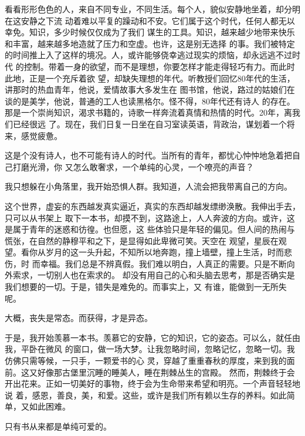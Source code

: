 		看看形形色色的人，来自不同专业，不同生活。每个人，貌似安静地坐着，却分明在这安静之下流
	动着难以平复的躁动和不安。它们属于这个时代，任何人都无以幸免。知识，多少时候仅仅成为了我们
	谋生的工具。知识，越来越少地带来快乐和丰富，越来越多地造就了压力和空虚。也许，这是别无选择
	的事。我们被特定的时间推上入了这样的境况。人，或许能够侥幸逃过现实的烦恼，却永远逃不过时代
	的控制。带着一身的欲望，而不是理想，你要怎样才能走得轻巧有力。而此时此地，正是一个充斥着欲
	望，却缺失理想的年代。听教授们回忆80年代的生活，讲那时的热血青年，他说，爱情故事大多发生在
	图书馆，他说，路过的姑娘们在谈的是美学，他说，普通的工人也读黑格尔。怪不得，80年代还有诗人
	的存在。那是一个崇尚知识，渴求书籍的，诗歌一样奔流着真情和热情的时代。20年，离我们已经很远
	了。现在，我们日复一日坐在自习室读英语，背政治，谋划着一个将来，感觉疲惫。

		这是个没有诗人，也不可能有诗人的时代。当所有的青年，都忧心忡忡地急着把自己打磨光滑，你
	又怎么敢奢求，一个单纯的心灵，一个嘹亮的声音？

		我只想躲在小角落里，我开始恐惧人群。我知道，人流会把我带离自己的方向。

		这个世界，虚妄的东西越发真实逼近，真实的东西却越发缥缈涣散。我伸出手去，只可以从书架上
	取下一本书，却摸不到，这路途上，人人奔波的方向。或许，这是属于青年的迷惑和彷徨。也但愿，这
	些体验只是年轻的偏见。但人间的热闹与慌张，在自然的静穆平和之下，是显得如此卑微可笑。天空在
	观望，星辰在观望。看你从岁月的这一头升起，不知所以地奔跑，撞上墙壁，撞上生活，时而悲伤，时
	而幸福。我们总是不辨真假。我们难以明白，人真正的需要。只是不断向外索求，一切别人也在索求的。
	却没有用自己的心和头脑去思考，那是否确实是我们想要的一切。于是，错失是难免的。而事实上，又
	有谁，能做到一无所失呢。

		大概，丧失是常态。而获得，才是异态。

		于是，我开始羡慕一本书。羡慕它的安静，它的知识，它的姿态。可以么，就任由我，平卧在微风
	的窗口，做一场大梦。让我忽略时间，忽略记忆，忽略一切。我仿佛只需等候，一只手，一颗爱书的心
	灵，穿越了重重春秋的厚度，来到我的面前。这又好像那古堡里沉睡的睡美人，睡在荆棘丛生的宫殿。
	然而，荆棘终于会开出花来。正如一切美好的事物，终于会为生命带来希望和明亮。一个声音轻轻地说
	着，感恩，善良，美，和爱。这些，或许是我们所有赖以生存的养料。如此简单，又如此困难。


		只有书从来都是单纯可爱的。

	\endwriting



